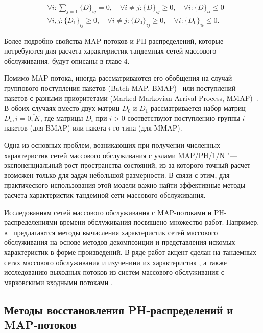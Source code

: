 \begin{equation}\label{eq:ch1_map_def}
    \begin{aligned}
        &\forall i: \sum\limits_{j=1} \{D\}_{ij} = 0, \quad
        \forall i \neq j: \{D\}_{ij} \geq 0, \quad
        \forall i: \{D\}_{ii} \leq 0\\
        &\forall i, j: \{D_{1}\}_{ij} \geq 0,\quad
        \forall i \neq j: \{D_{0}\}_{ij} \geq 0, \quad
        \forall i: \{D_{0}\}_{ii} \leq 0.
    \end{aligned}
\end{equation}

Более подробно свойства MAP-потоков и PH-распределений, которые потребуются для расчета характеристик тандемных сетей массового обслуживания, будут описаны в главе 4.

Помимо MAP-потока, иногда рассматриваются его обобщения на случай группового поступления пакетов (Batch MAP, BMAP)~\cite{Lucantoni1993, Dudin2000, VishnevskyDudin2018} или поступлений пакетов с разными приоритетами (Marked Markovian Arrival Process, MMAP)~\cite{HE2001, VanHoudt2012, Buchholz2010, Klimenok2020}. В обоих случаях вместо двух матриц $D_0$ и $D_1$ рассматривается набор матриц $D_i, i = \overline{0,K}$, где матрицы $D_i$ при $i > 0$ соответствуют поступлению группы $i$ пакетов (для BMAP) или пакета $i$-го типа (для MMAP).

Одна из основных проблем, возникающих при получении численных характеристик сетей массового обслуживания с узлами MAP/PH/1/N "--- экспоненциальный рост пространства состояний, из-за которого точный расчет возможен только для задач небольшой размерности. В связи с этим, для практического использования этой модели важно найти эффективные методы расчета характеристик тандемной сети массового обслуживания.

Исследованиям сетей массового обслуживания с MAP-потоками и PH-распределениями времени обслуживания посвящено множество работ. Например, в~\cite{Strelen1998, Henderson1990, Strelen1997, Strelen1997a} предлагаются методы вычисления характеристик сетей массового обслуживания на основе методов декомпозиции и представления искомых характеристик в форме произведений. В ряде работ акцент сделан на тандемных сетях массового обслуживания и изучениии их характеристик \cite{Kim2018, Kim2012, Kim2007, Buchholz2006}, а также исследованию выходных потоков из систем массового обслуживания с марковскими входными потоками \cite{Bean1998, Lian2011}.

\subsection{Методы восстановления PH-распределений и MAP-потоков}\label{sec:ch1_qs_ph_fitting}


